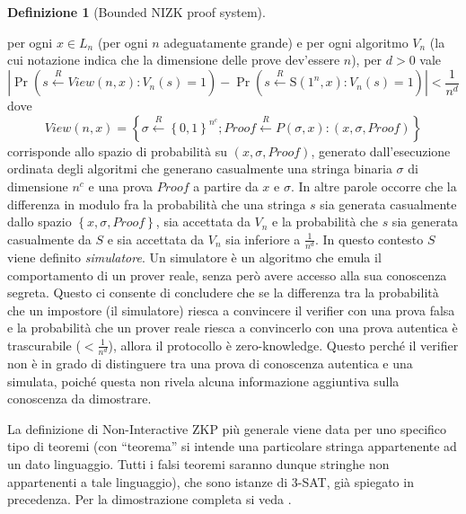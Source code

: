 \documentclass{article}
\theoremstyle{definition}
\newtheorem{definizione}{Definizione}
\begin{document}
\begin{definizione}[Bounded NIZK proof system]
\begin{enumerate}
        per ogni $x \in L_n$ (per ogni $n$ adeguatamente grande) e per ogni algoritmo $V_n$ (la cui notazione indica che la dimensione delle prove dev'essere $n$), per $d > 0$ vale 
        \begin{equation*}
            \left| \Pr\left(s \overset{R}{\leftarrow}View(n,x) : V_n(s) = 1\right) - \Pr \left(s \overset{R}{\leftarrow}\mathrm{S}(1^n, x) : V_n(s) = 1 \right) \right| < \frac{1}{n^d}
        \end{equation*} 
        dove 
        \begin{equation*}
            View(n,x) = \left\{ \sigma \overset{R}{\leftarrow} \left\{ 0, 1\right\}^{n^c}; Proof \overset{R}{\leftarrow}P(\sigma, x) : (x, \sigma, Proof)  \right\}
        \end{equation*}  
        corrisponde allo spazio di probabilità su $(x, \sigma, Proof)$, generato dall'esecuzione ordinata degli algoritmi che generano casualmente una stringa binaria $\sigma$ di dimensione $n^c$ e una prova $Proof$ a partire da $x$ e $\sigma$. 
        In altre parole occorre che la differenza in modulo fra la probabilità che una stringa $s$ sia generata casualmente dallo spazio $\left\{ x, \sigma, Proof \right\}$, sia accettata da $V_n$ e la probabilità che $s$ sia generata casualmente da $S$ e sia accettata da $V_n$ sia inferiore a $\frac{1}{n^d}$.
        In questo contesto $S$ viene definito \emph{simulatore}. Un simulatore è un algoritmo che emula il comportamento di un prover reale, senza però avere accesso alla sua conoscenza segreta. Questo ci consente di concludere che se la differenza tra la probabilità che un impostore (il simulatore) riesca a convincere il verifier con una prova falsa e la probabilità che un prover reale riesca a convincerlo con una prova autentica è trascurabile ($< \frac{1}{n^d}$), allora il protocollo è zero-knowledge. Questo perché il verifier non è in grado di distinguere tra una prova di conoscenza autentica e una simulata, poiché questa non rivela alcuna informazione aggiuntiva sulla conoscenza da dimostrare.
    \end{enumerate}
\end{definizione}

La definizione di Non-Interactive ZKP più generale viene data per uno specifico tipo di teoremi (con ``teorema'' si intende una particolare stringa appartenente ad un dato linguaggio. Tutti i falsi teoremi saranno dunque stringhe non appartenenti a tale linguaggio), che sono istanze di 3-SAT, già spiegato in precedenza.
Per la dimostrazione completa si veda \cite[pp.1105-1106]{noninteractive}.
\end{document}
